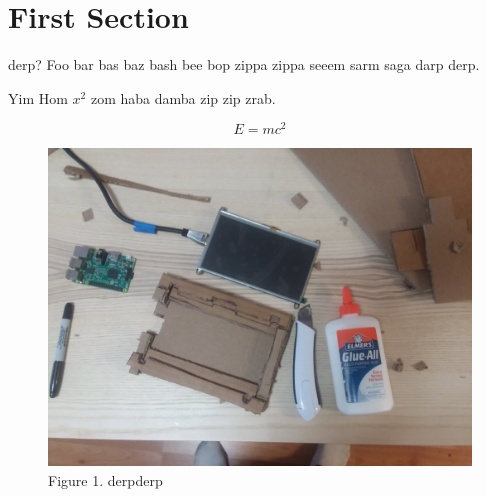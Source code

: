 \documentclass[11pt]{article}
\begin{document}
\section{
First Section}



    derp?
    Foo bar bas baz bash bee bop zippa zippa seeem sarm saga darp derp.
 



    Yim Hom $x^2$ zom haba damba zip zip zrab.
    
    $$E=mc^2$$



\begin{figure}
    
\includegraphics[width=\linewidth]{../figures/x7uOC3w.jpg}

    \caption{Figure 1. derpderp}
\end{figure}
\end{document}
